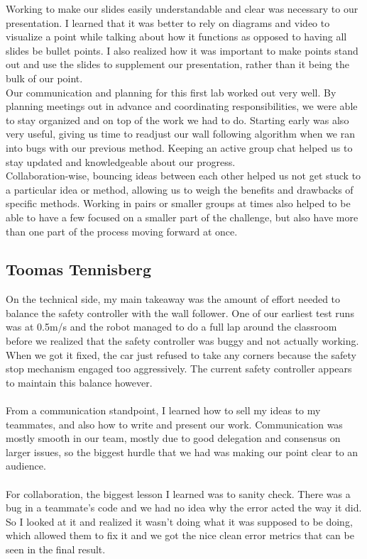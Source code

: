 \documentclass{article}
\begin{document}
Working to make our slides easily understandable and clear was necessary to our presentation. I learned that it was better to rely on diagrams and video to visualize a point while talking about how it functions as opposed to having all slides be bullet points. I also realized how it was important to make points stand out and use the slides to supplement our presentation, rather than it being the bulk of our point. \\

Our communication and planning for this first lab worked out very well. By planning meetings out in advance and coordinating responsibilities, we were able to stay organized and on top of the work we had to do. Starting early was also very useful, giving us time to readjust our wall following algorithm when we ran into bugs with our previous method. Keeping an active group chat helped us to stay updated and knowledgeable about our progress. \\

Collaboration-wise, bouncing ideas between each other helped us not get stuck to a particular idea or method, allowing us to weigh the benefits and drawbacks of specific methods. Working in pairs or smaller groups at times also helped to be able to have a few focused on a smaller part of the challenge, but also have more than one part of the process moving forward at once. \\


\subsection{Toomas Tennisberg}

On the technical side, my main takeaway was the amount of effort needed to balance the safety controller with the wall follower. One of our earliest test runs was at 0.5m/s and the robot managed to do a full lap around the classroom before we realized that the safety controller was buggy and not actually working. When we got it fixed, the car just refused to take any corners because the safety stop mechanism engaged too aggressively. The current safety controller appears to maintain this balance however.\\\\
From a communication standpoint, I learned how to sell my ideas to my teammates, and also how to write and present our work. Communication was mostly smooth in our team, mostly due to good delegation and consensus on larger issues, so the biggest hurdle that we had was making our point clear to an audience.\\\\
For collaboration, the biggest lesson I learned was to sanity check. There was a bug in a teammate's code and we had no idea why the error acted the way it did. So I looked at it and realized it wasn't doing what it was supposed to be doing, which allowed them to fix it and we got the nice clean error metrics that can be seen in the final result.
\end{document}
